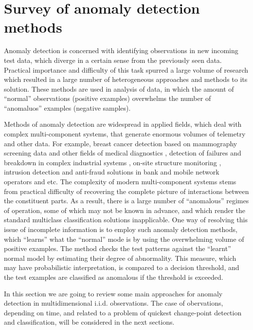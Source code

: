 \documentclass[a4paper,14pt]{extarticle}
\begin{document}

\section{Survey of anomaly detection methods} %
\label{sec:survey}

Anomaly detection is concerned with identifying observations in new incoming test
data, which diverge in a certain sense from the previously seen data. Practical importance
and difficulty of this task spurred a large volume of research which resulted in
a large number of heterogeneous approaches and methods to its solution. These methods
are used in analysis of data, in which the amount of ``normal'' observations (positive
examples) overwhelms the number of ``anomaluos'' examples (negative samples).

Methods of anomaly detection are widespread in applied fields, which deal with complex
multi-component systems, that generate enormous volumes of telemetry and other data.
For example, breast cancer detection based on mammography screening data \cite{tarassenko1995}
and other fields of medical diagnostics \cite{quinn2007,clifton2011}, detection of
failures and breakdown in complex industrial systems \cite{tarassenko2009}, on-site
structure monitoring \cite{surace2010}, intrusion detection and anti-fraud solutions
in bank and mobile network operators \cite{patcha2007,jyothsna2011} and etc. The
complexity of modern multi-component systems stems from practical difficulty of recovering
the complete picture of interactions between the constituent parts. As a result,
there is a large number of ``anomalous'' regimes of operation, some of which may
not be known in advance, and which render the standard multiclass classification
solutions inapplicable. One way of resolving this issue of incomplete information
is to employ such anomaly detection methods, which ``learns'' what the ``normal''
mode is by using the overwhelming volume of positive examples. The method checks
the test patterns against the ``learnt'' normal model by estimating their degree
of abnormality. This measure,  which may have probabilistic interpretation, is compared
to a decision threshold, and the test examples are classified as anomalous if the
threshold is exceeded.

In this section we are going to review some main approaches for anomaly detection
in multidimensional i.i.d. observations. The case of obervations, depending on time,
and related to a problem of quickest change-point detection and classification, will
be considered in the next sections. 
\end{document}

